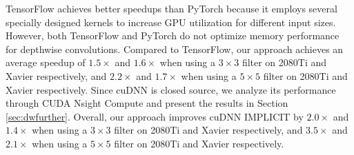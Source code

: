 TensorFlow achieves better speedups than PyTorch because it employs several specially designed kernels to increase GPU utilization for different input sizes. However, both TensorFlow and PyTorch do not optimize memory performance for depthwise convolutions. Compared to TensorFlow, our approach achieves an average speedup of $1.5 \times$ and $1.6 \times$ when using a $3 \times 3$ filter on 2080Ti and Xavier respectively, and $2.2 \times$ and $1.7 \times$ when using a $5 \times 5$ filter on 2080Ti and Xavier respectively. Since cuDNN is closed source, we analyze its performance through CUDA Nsight Compute \cite{nsightcompute} and present the results in Section \ref{sec:dwfurther}. Overall, our approach improves cuDNN IMPLICIT by $2.0\times$ and $1.4\times$ when using a $3 \times 3$  filter on 2080Ti and Xavier respectively, and $3.5\times$ and $2.1\times$ when using a $5 \times 5$ filter on 2080Ti and Xavier respectively.
%
%
